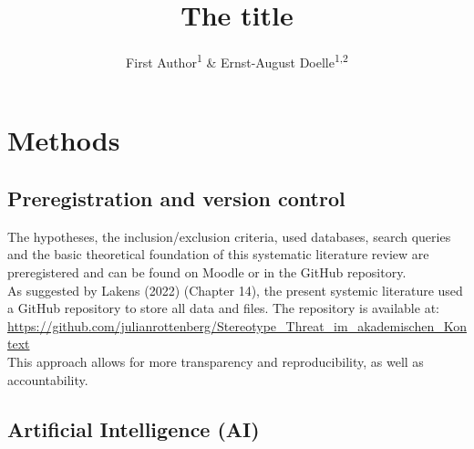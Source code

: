 \documentclass[
  stu, a4paper,floatsintext]{apa7}
\title{The title}
\author{First Author\textsuperscript{1} \& Ernst-August Doelle\textsuperscript{1,2}}
\date{}
\affiliation{\vspace{0.5cm}\textsuperscript{1} Wilhelm-Wundt-University\\\textsuperscript{2} Konstanz Business School}
\begin{document}
\maketitle

\section{Methods}\label{methods}

\subsection{Preregistration and version control}\label{preregistration-and-version-control}

The hypotheses, the inclusion/exclusion criteria, used databases, search queries and the basic theoretical foundation of this systematic literature review are preregistered and can be found on Moodle or in the GitHub repository.\\
As suggested by Lakens (2022) (Chapter 14), the present systemic literature used a GitHub repository to store all data and files. The repository is available at: \url{https://github.com/julianrottenberg/Stereotype_Threat_im_akademischen_Kontext}\\
This approach allows for more transparency and reproducibility, as well as accountability.

\subsection{Artificial Intelligence (AI)}\label{artificial-intelligence-ai}
\end{document}
